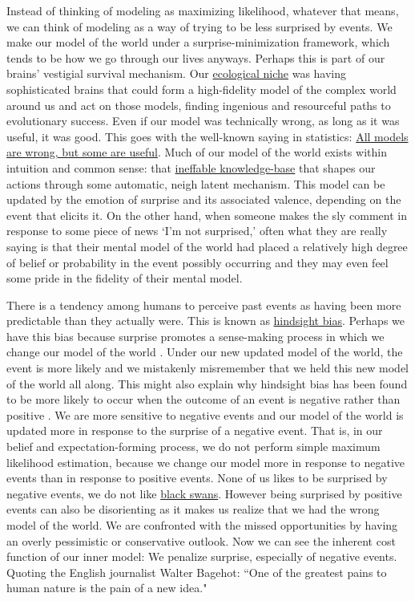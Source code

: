 \documentclass{article}
\begin{document}
Instead of thinking of modeling as maximizing likelihood, whatever that means, we can think of modeling as a way of trying to be less surprised by events. We make our model of the world under a surprise-minimization framework, which tends to be how we go through our lives anyways. Perhaps this is part of our brains' vestigial survival mechanism. Our \href{https://en.wikipedia.org/wiki/Ecological_niche}{ecological niche} was having sophisticated brains that could form a high-fidelity model of the complex world around us and act on those models, finding ingenious and resourceful paths to evolutionary success. Even if our model was technically wrong, as long as it was useful, it was good. This goes with the well-known saying in statistics: \href{https://en.wikipedia.org/wiki/All_models_are_wrong}{All models are wrong, but some are useful}. Much of our model of the world exists within intuition and common sense: that \href{https://en.wikipedia.org/wiki/Unconscious_mind}{ineffable knowledge-base} that shapes our actions through some automatic, neigh latent mechanism. This model can be updated by the emotion of surprise and its associated valence, depending on the event that elicits it. On the other hand, when someone makes the sly comment in response to some piece of news `I'm not surprised,' often what they are really saying is that their mental model of the world had placed a relatively high degree of belief or probability in the event possibly occurring and they may even feel some pride in the fidelity of their mental model. 

There is a tendency among humans to perceive past events as having been more predictable than they actually were. This is known as \href{https://en.wikipedia.org/wiki/Hindsight_bias}{hindsight bias}. Perhaps we have this bias because surprise promotes a sense-making process in which we change our model of the world \cite{Mller2007}. Under our new updated model of the world, the event is more likely and we mistakenly misremember that we held this new model of the world all along. This might also explain why hindsight bias has been found to be more likely to occur when the outcome of an event is negative rather than positive \cite{Schkade1991}. We are more sensitive to negative events and our model of the world is updated more in response to the surprise of a negative event. That is, in our belief and expectation-forming process, we do not perform simple maximum likelihood estimation, because we change our model more in response to negative events than in response to positive events. None of us likes to be surprised by negative events, we do not like \href{https://en.wikipedia.org/wiki/Black_swan_theory}{black swans}. However being surprised by positive events can also be disorienting as it makes us realize that we had the wrong model of the world. We are confronted with the missed opportunities by having an overly pessimistic or conservative outlook. Now we can see the inherent cost function of our inner model: We penalize surprise, especially of negative events. Quoting the English journalist Walter Bagehot: ``One of the greatest pains to human nature is the pain of a new idea."
\end{document}
